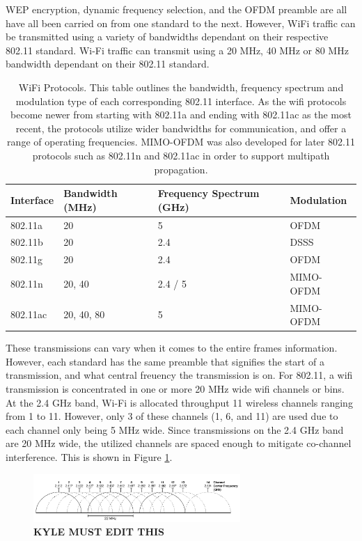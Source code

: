 WEP encryption, dynamic frequency selection, and the OFDM preamble are all have all been carried on from one standard to the next.  However, WiFi traffic can be transmitted using a variety of bandwidths dependant on their respective 802.11 standard.  Wi-Fi traffic can transmit using a 20 MHz, 40 MHz or 80 MHz bandwidth dependant on their 802.11 standard. 
\begin{table}[ht]
\centering
\caption{WiFi Protocols.  This table outlines the bandwidth, frequency spectrum and modulation type of each corresponding 802.11 interface. As the wifi protocols become newer from starting with 802.11a and ending with 802.11ac as the most recent, the protocols utilize wider bandwidths for communication, and offer a range of operating frequencies. MIMO-OFDM was also developed for later 802.11 protocols such as 802.11n and 802.11ac in order to support multipath propagation.}
\label{table:wifi_protocols}
\begin{tabular}{|l|l|l|l|}
  \hline
  Interface & Bandwidth (MHz) & Frequency Spectrum (GHz) & Modulation \\ \hline
          802.11a &              20 &                  5 &       OFDM \\
          802.11b &              20 &                2.4 &       DSSS \\
          802.11g &              20 &                2.4 &       OFDM \\
          802.11n &          20, 40 &            2.4 / 5 &  MIMO-OFDM \\
         802.11ac &      20, 40, 80 &                  5 &  MIMO-OFDM \\ \hline
\end{tabular}
\end{table}\par
These transmissions can vary when it comes to the entire frames information. However, each standard has the same preamble that signifies the start of a transmission, and what central freuency the transmission is on.  For 802.11, a wifi transmission is concentrated in one or more 20 MHz wide wifi channels or bins. At the 2.4 GHz band, Wi-Fi is allocated throughput 11 wireless channels ranging from 1 to 11.  However, only 3 of these channels (1, 6, and 11) are used due to each channel only being 5 MHz wide.  Since transmissions on the 2.4 GHz band are 20 MHz wide, the utilized channels are spaced enough to mitigate co-channel interference. This is shown in Figure \ref{fig:2.4GHz_channel}.
\begin{figure}[ht]
\centering
\includegraphics[width=0.70\textwidth]{img/2_GHz_Channels.png}
\caption{\textbf{KYLE MUST EDIT THIS}}
\label{fig:2.4GHz_channel}
\end{figure}
